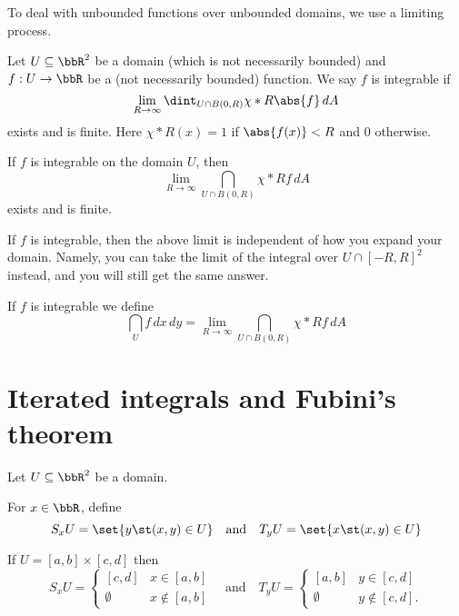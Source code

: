   To deal with unbounded functions over unbounded domains, we use a limiting 
process.
  \begin{definition}
    Let $U \subseteq \bbR^2$ be a domain (which is not necessarily bounded) and 
$f:U \to \bbR$ be a (not necessarily bounded) function.
    We say $f$ is integrable if
    \begin{equation*}
      \lim_{R \to \infty} \dint_{U \cap B(0, R)} \chi*R \abs{f} \, dA
    \end{equation*}
    exists and is finite.
    Here $\chi*R(x) = 1$ if $\abs{f(x)} < R$ and $0$ otherwise.
  \end{definition}
  \begin{proposition}
    If $f$ is integrable on the domain $U$, then
    \begin{equation*}
      \lim_{R \to \infty} \dint_{U \cap B(0, R)} \chi*R f \, dA
    \end{equation*}
    exists and is finite.
  \end{proposition}
  \begin{remark}
    If $f$ is integrable, then the above limit is independent of how you expand 
your domain.
    Namely, you can take the limit of the integral over $U \cap [-R, R]^2$ 
instead, and you will still get the same answer.
  \end{remark}
  \begin{definition}
    If $f$ is integrable we define
    \begin{equation*}
      \dint_U f \, dx \, dy = \lim_{R \to \infty} \dint_{U \cap B(0, R)} \chi*R 
f \, dA
    \end{equation*}
  \end{definition}
  \section{Iterated integrals and Fubini's theorem}

  Let $U \subseteq \bbR^2$ be a domain.
  \begin{definition}
    For $x \in \bbR$, define
    \begin{equation*}
      S_x U = \set{y \st (x, y) \in U}
      \quad\text{and}\quad
      T_y U = \set{x \st (x, y) \in U}
    \end{equation*}
  \end{definition}

  \begin{example}
    If $U = [a, b] \times [c, d]$ then
    \begin{equation*}
      S_x U = 
      \begin{cases}
	[c,d] & x \in [a, b]\\
	\emptyset & x \not\in [a, b]
      \end{cases}
      \quad\text{and}\quad
      T_y U = \begin{cases}
	[a, b] & y \in [c, d]\\
	\emptyset & y \not\in [c,d].
      \end{cases}
    \end{equation*}
  \end{example}

